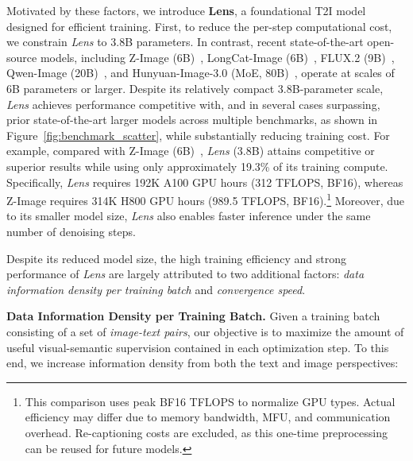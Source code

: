 \documentclass{llmxive}
\begin{document}
Motivated by these factors, we introduce \textbf{Lens}, a foundational T2I model designed for efficient training. First, to reduce the per-step computational cost, we constrain \textit{Lens} to 3.8B parameters. In contrast, recent state-of-the-art open-source models, including Z-Image (6B)~\citep{cai2025zimage}, LongCat-Image (6B)~\citep{team2025longcat}, FLUX.2 (9B)~\citep{flux-2-2025}, Qwen-Image (20B)~\citep{wu2025qwenimage}, and Hunyuan-Image-3.0 (MoE, 80B)~\citep{cao2025hunyuanimage}, operate at scales of 6B parameters or larger. Despite its relatively compact 3.8B-parameter scale, \textit{Lens} achieves performance competitive with, and in several cases surpassing, prior state-of-the-art larger models across multiple benchmarks, as shown in Figure~\ref{fig:benchmark_scatter}, while substantially reducing training cost. For example, compared with Z-Image (6B)~\citep{cai2025zimage}, \textit{Lens} (3.8B) attains competitive or superior results while using only approximately 19.3\% of its training compute.
Specifically, \textit{Lens} requires 192K A100 GPU hours (312 TFLOPS, BF16), whereas Z-Image requires 314K H800 GPU hours (989.5 TFLOPS, BF16).\footnote{This comparison uses peak BF16 TFLOPS to normalize GPU types. Actual efficiency may differ due to memory bandwidth, MFU, and communication overhead. Re-captioning costs are excluded, as this one-time preprocessing can be reused for future models.} Moreover, due to its smaller model size, \textit{Lens} also enables faster inference under the same number of denoising steps.


Despite its reduced model size, the high training efficiency and strong performance of \textit{Lens} are largely attributed to two additional factors: \textit{data information density per training batch} and \textit{convergence speed}.

\noindent\textbf{Data Information Density per Training Batch.}
Given a training batch consisting of a set of \textit{image-text pairs}, our objective is to maximize the amount of useful visual-semantic supervision contained in each optimization step. To this end, we increase information density from both the text and image perspectives:
\end{document}

